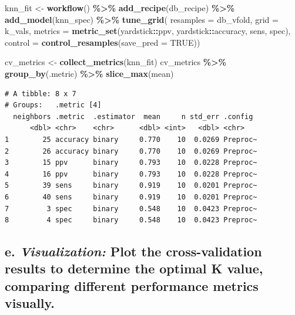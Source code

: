 \documentclass[
]{book}
\newenvironment{Shaded}{\begin{snugshade}}{\end{snugshade}}
\newcommand{\AttributeTok}[1]{\textcolor[rgb]{0.13,0.29,0.53}{#1}}
\newcommand{\ConstantTok}[1]{\textcolor[rgb]{0.56,0.35,0.01}{#1}}
\newcommand{\FunctionTok}[1]{\textcolor[rgb]{0.13,0.29,0.53}{\textbf{#1}}}
\newcommand{\NormalTok}[1]{#1}
\newcommand{\OtherTok}[1]{\textcolor[rgb]{0.56,0.35,0.01}{#1}}
\newcommand{\SpecialCharTok}[1]{\textcolor[rgb]{0.81,0.36,0.00}{\textbf{#1}}}
\begin{document}
\begin{Shaded}
\begin{Highlighting}[]
\NormalTok{knn\_fit }\OtherTok{\textless{}{-}} \FunctionTok{workflow}\NormalTok{() }\SpecialCharTok{\%\textgreater{}\%}
  \FunctionTok{add\_recipe}\NormalTok{(db\_recipe) }\SpecialCharTok{\%\textgreater{}\%}
  \FunctionTok{add\_model}\NormalTok{(knn\_spec) }\SpecialCharTok{\%\textgreater{}\%}
  \FunctionTok{tune\_grid}\NormalTok{(}
    \AttributeTok{resamples =}\NormalTok{ db\_vfold, }
    \AttributeTok{grid =}\NormalTok{ k\_vals,}
    \AttributeTok{metrics =} \FunctionTok{metric\_set}\NormalTok{(yardstick}\SpecialCharTok{::}\NormalTok{ppv, yardstick}\SpecialCharTok{::}\NormalTok{accuracy, sens, spec),}
    \AttributeTok{control =} \FunctionTok{control\_resamples}\NormalTok{(}\AttributeTok{save\_pred =} \ConstantTok{TRUE}\NormalTok{))}
\end{Highlighting}
\end{Shaded}

\begin{Shaded}
\begin{Highlighting}[]
\NormalTok{cv\_metrics }\OtherTok{\textless{}{-}} \FunctionTok{collect\_metrics}\NormalTok{(knn\_fit) }
\NormalTok{cv\_metrics }\SpecialCharTok{\%\textgreater{}\%} \FunctionTok{group\_by}\NormalTok{(.metric) }\SpecialCharTok{\%\textgreater{}\%} \FunctionTok{slice\_max}\NormalTok{(mean) }
\end{Highlighting}
\end{Shaded}

\begin{verbatim}
# A tibble: 8 x 7
# Groups:   .metric [4]
  neighbors .metric  .estimator  mean     n std_err .config 
      <dbl> <chr>    <chr>      <dbl> <int>   <dbl> <chr>   
1        25 accuracy binary     0.770    10  0.0269 Preproc~
2        26 accuracy binary     0.770    10  0.0269 Preproc~
3        15 ppv      binary     0.793    10  0.0228 Preproc~
4        16 ppv      binary     0.793    10  0.0228 Preproc~
5        39 sens     binary     0.919    10  0.0201 Preproc~
6        40 sens     binary     0.919    10  0.0201 Preproc~
7         3 spec     binary     0.548    10  0.0423 Preproc~
8         4 spec     binary     0.548    10  0.0423 Preproc~
\end{verbatim}

\hypertarget{e.-visualization-plot-the-cross-validation-results-to-determine-the-optimal-k-value-comparing-different-performance-metrics-visually.}{%
\subsection{\texorpdfstring{e. \emph{Visualization:} Plot the cross-validation results to determine the optimal K value, comparing different performance metrics visually.}{e. Visualization: Plot the cross-validation results to determine the optimal K value, comparing different performance metrics visually.}}\label{e.-visualization-plot-the-cross-validation-results-to-determine-the-optimal-k-value-comparing-different-performance-metrics-visually.}}
\end{document}
